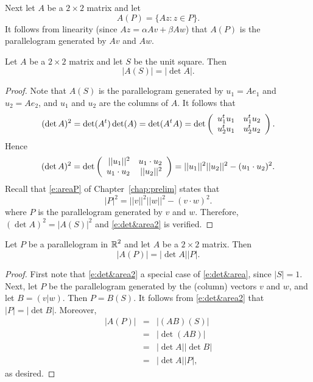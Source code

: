 \documentclass{ximera}
\begin{document}
Next let $A$ be a $2\times 2$ matrix and let
\[
A(P) = \{Az:z\in P\}.
\]
It follows from linearity (since $Az=\alpha Av+\beta Aw$) that $A(P)$ is the
parallelogram generated by $Av$ and $Aw$.

\begin{proposition}  \label{P:det&area}
Let $A$ be a $2\times 2$ matrix and let $S$ be the unit square.  Then 
\begin{equation}  \label{e:det&area2}
|A(S)| = |\det A|.
\end{equation}
\end{proposition}

\begin{proof}   Note that $A(S)$ is the parallelogram generated by $u_1=Ae_1$ and 
$u_2=Ae_2$, and $u_1$ and $u_2$ are the columns of $A$.  It follows that
\[
(\det A)^2=\det(A^t)\det(A)=\det(A^tA) =
\det\left(\begin{array}{rr} u_1^tu_1 & u_1^tu_2\\ u_2^tu_1 &u_2^tu_2\end{array}\right).
\]
Hence
\[
(\det A)^2=
\det\left(\begin{array}{rr} ||u_1||^2 & u_1\cdot u_2\\ u_1\cdot u_2 &||u_2||^2\end{array}\right) =
||u_1||^2||u_2||^2-(u_1\cdot u_2)^2.
\]
Recall that \eqref{e:areaP} of Chapter~\ref{chap:prelim} states that
\[
|P|^2 = ||v||^2||w||^2 - (v\cdot w)^2.
\]
where $P$ is the parallelogram generated by $v$ and $w$.  Therefore, 
$(\det A)^2 = |A(S)|^2$ and \eqref{e:det&area2} is verified. \end{proof}


\begin{theorem}  \label{T:det&area}
Let $P$ be a parallelogram in $\mbox{$\Bbb{R}$}^2$ and let $A$ be a $2\times 2$
matrix.  Then
\begin{equation} \label{e:det&area}
|A(P)| = |\det A||P|.
\end{equation}
\end{theorem}

\begin{proof}  First note that \eqref{e:det&area2} a special case of \eqref{e:det&area}, 
since $|S|=1$.   Next, let $P$ be the parallelogram generated by the (column)
vectors $v$ and $w$, and let $B=(v|w)$.  Then $P=B(S)$.  It
follows from \eqref{e:det&area2} that $|P|=|\det B|$.  Moreover,
\begin{eqnarray*}
|A(P)| & = & |(AB)(S)| \\
& = & |\det(AB)| \\
& = & |\det A||\det B| \\
& = & |\det A||P|,
\end{eqnarray*}
as desired.  \end{proof}

\EXER

\end{document}

